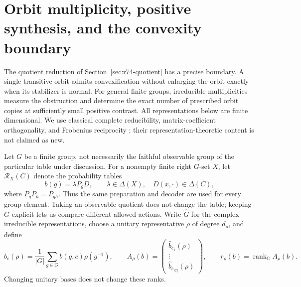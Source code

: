 \section{Orbit multiplicity, positive synthesis, and the convexity boundary}
\label{sec:r75-orbit-multiplicity}

The quotient reduction of Section~\ref{sec:r74-quotient} has a precise
boundary. A single transitive orbit admits convexification without enlarging
the orbit exactly when its stabilizer is normal. For general finite groups,
irreducible multiplicities measure the obstruction and determine the exact
number of prescribed orbit copies at sufficiently small positive contrast.
All representations below are finite dimensional. We use classical complete
reducibility, matrix-coefficient orthogonality, and Frobenius reciprocity
\cite{Serre77}; their representation-theoretic content is not claimed as new.

Let $G$ be a finite group, not necessarily the faithful observable group of
the particular table under discussion. For a nonempty finite right $G$-set
$X$, let $\mathcal R_X(C)$ denote the probability tables
\[
 b(g)=\lambda P_gD,\qquad
 \lambda\in\Delta(X),\quad D(x,\cdot)\in\Delta(C),
\]
where $P_gP_h=P_{gh}$. Thus the same preparation and decoder are used for
every group element. Taking an observable quotient does not change the
table; keeping $G$ explicit lets us compare different allowed actions.
Write $\widehat G$ for the complex irreducible representations, choose a
unitary representative $\rho$ of degree $d_\rho$, and define
\begin{equation}\label{eq:r75-fourier-block}
 \widehat b_c(\rho)=\frac1{|G|}\sum_{g\in G}b(g,c)\rho(g^{-1}),
 \qquad
 A_\rho(b)=\begin{pmatrix}
 \widehat b_{c_1}(\rho)\\ \vdots\\ \widehat b_{c_{|C|}}(\rho)
 \end{pmatrix},
 \qquad r_\rho(b)=\operatorname{rank}_{\mathbb C}A_\rho(b).
\end{equation}
Changing unitary bases does not change these ranks.

